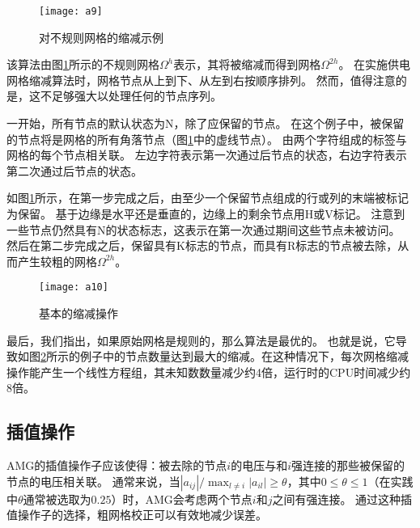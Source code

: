 \begin{figure}[H] %
  \centering
  \texttt{[image: a9]}
  \caption{对不规则网格的缩减示例}
  \label{fig:a9}
\end{figure}

该算法由图\ref{fig:a9}所示的不规则网格$\Omega^h$表示，其将被缩减而得到网格$\Omega^{2h}$。 在实施供电网格缩减算法时，网格节点从上到下、从左到右按顺序排列。 然而，值得注意的是，这不足够强大以处理任何的节点序列。

一开始，所有节点的默认状态为N，除了应保留的节点。 在这个例子中，被保留的节点将是网格的所有角落节点（图\ref{fig:a9}中的虚线节点）。 由两个字符组成的标签与网格的每个节点相关联。 左边字符表示第一次通过后节点的状态，右边字符表示第二次通过后节点的状态。

如图\ref{fig:a9}所示，在第一步完成之后，由至少一个保留节点组成的行或列的末端被标记为保留。 基于边缘是水平还是垂直的，边缘上的剩余节点用H或V标记。 注意到一些节点仍然具有N的状态标志，这表示在第一次通过期间这些节点未被访问。 然后在第二步完成之后，保留具有K标志的节点，而具有R标志的节点被去除，从而产生较粗的网格$\Omega^{2h}$。

\begin{figure}[H] %
  \centering
  \texttt{[image: a10]}
  \caption{基本的缩减操作}
  \label{fig:a10}
\end{figure}

最后，我们指出，如果原始网格是规则的，那么算法是最优的。 也就是说，它导致如图\ref{fig:a10}所示的例子中的节点数量达到最大的缩减。在这种情况下，每次网格缩减操作能产生一个线性方程组，其未知数数量减少约4倍，运行时的CPU时间减少约8倍。

\subsection{插值操作}

AMG的插值操作子应该使得：被去除的节点$i$的电压与和$i$强连接的那些被保留的节点的电压相关联。 通常来说，当$|a_{ij}|/\max_{l\neq i}|a_{il}|\geq \theta$，其中$0\leq \theta \leq 1$（在实践中$\theta$通常被选取为$0.25$）时，AMG会考虑两个节点$i$和$j$之间有强连接。 通过这种插值操作子的选择，粗网格校正可以有效地减少误差。

